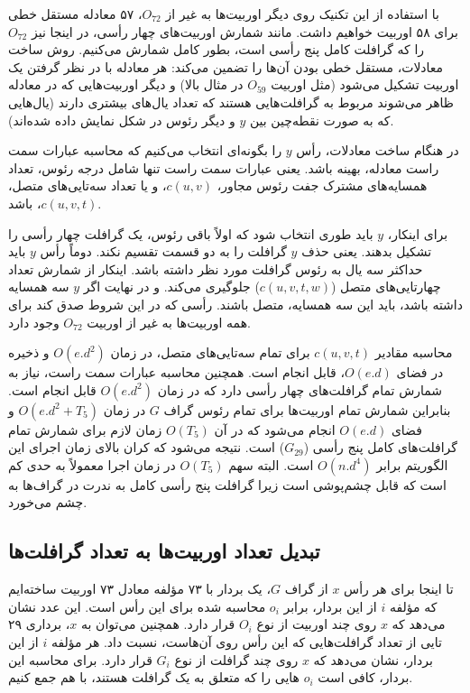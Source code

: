 با استفاده از این تکنیک روی دیگر اوربیت‌ها به غیر از $O_{72}$،
 ۵۷ معادله مستقل خطی برای ۵۸ اوربیت خواهیم داشت. مانند شمارش اوربیت‌های چهار رأسی، در اینجا نیز $O_{72}$ را که گرافلت کامل پنج رأسی است، بطور کامل شمارش می‌کنیم. روش ساخت معادلات، مستقل خطی بودن آن‌ها را تضمین می‌کند: هر معادله با در نظر گرفتن یک اوربیت تشکیل می‌شود (مثل اوربیت $O_{59}$ در مثال بالا) و دیگر اوربیت‌هایی که در معادله ظاهر می‌شوند مربوط به گرافلت‌هایی هستند که تعداد یال‌های بیشتری دارند (یال‌هایی که به صورت نقطه‌چین بین $y$ و دیگر رئوس در شکل  نمایش داده شده‌اند).
 
در هنگام ساخت معادلات، رأس $y$ را بگونه‌ای انتخاب می‌کنیم که محاسبه عبارات سمت راست معادله، بهینه باشد. یعنی عبارات سمت راست تنها شامل درجه رئوس، تعداد همسایه‌های مشترک جفت رئوس مجاور، $c(u,v)$، و یا تعداد سه‌تایی‌های متصل، $c(u,v,t)$، باشد.

برای اینکار، $y$ باید طوری انتخاب شود که اولاً  باقی رئوس، یک گرافلت چهار رأسی را تشکیل بدهند. یعنی حذف $y$ گرافلت را به دو قسمت تقسیم نکند. دوماً رأس $y$ باید حداکثر سه یال به رئوس گرافلت مورد نظر داشته باشد. اینکار از شمارش تعداد چهارتایی‌های متصل ($c(u,v,t,w)$) جلوگیری می‌کند. و در نهایت اگر $y$ سه همسایه داشته باشد، باید این سه همسایه، متصل باشند. رأسی که در این شروط صدق کند برای همه اوربیت‌ها به غیر از اوربیت $O_{72}$ وجود دارد.

محاسبه مقادیر $c(u,v,t)$‌ برای تمام سه‌تایی‌های متصل، در زمان $O(e.d^2)$ و ذخیره در فضای $O(e.d)$، قابل انجام است. همچنین محاسبه عبارات سمت راست، نیاز به شمارش تمام گرافلت‌های چهار رأسی دارد که در زمان $O(e.d^2)$ قابل انجام است. بنابراین شمارش تمام اوربیت‌ها برای تمام رئوس گراف $G$ در زمان $O(e.d^2 + T_5)$ و فضای $O(e.d)$ انجام می‌شود که در آن $O(T_5)$ زمان لازم برای شمارش تمام گرافلت‌های کامل پنج رأسی ($G_{29}$) است. نتیجه می‌شود که کران بالای زمان اجرای این الگوریتم برابر $O(n.d^4)$ است. البته سهم $O(T_5)$ در زمان اجرا معمولاً به حدی کم است که قابل چشم‌پوشی است زیرا گرافلت پنج رأسی کامل به ندرت در گراف‌ها به چشم می‌خورد.

\subsection{تبدیل تعداد اوربیت‌ها به تعداد گرافلت‌ها}
تا اینجا برای هر رأس $x$ از گراف $G$، یک بردار با ۷۳ مؤلفه معادل ۷۳ اوربیت ساخته‌ایم که مؤلفه $i$ از این بردار، برابر $o_i$ محاسبه شده برای این رأس است. این عدد نشان می‌دهد که $x$ روی چند اوربیت از نوع $O_i$ قرار دارد. همچنین می‌توان به $x$، برداری ۲۹ تایی از تعداد گرافلت‌هایی که این رأس روی آن‌هاست، نسبت داد. هر مؤلفه $i$ از این بردار، نشان می‌دهد که $x$ روی چند گرافلت از نوع $G_i$ قرار دارد. برای محاسبه این بردار، کافی است $o_i$ هایی را که متعلق به یک گرافلت هستند، با هم جمع کنیم.


